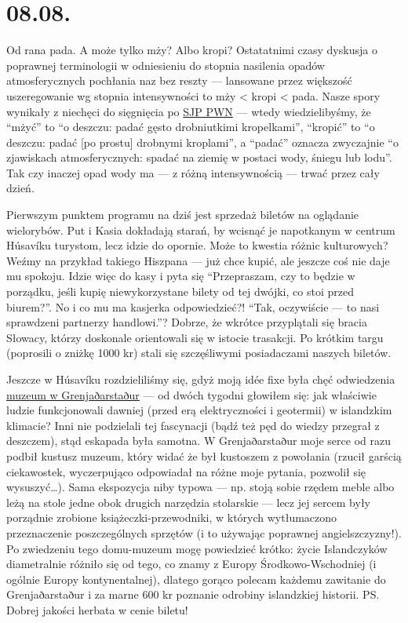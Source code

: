 \chapter*{08.08.}

Od rana pada. A może tylko mży? Albo kropi? Ostatatnimi czasy dyskusja o poprawnej terminologii w odniesieniu do stopnia nasilenia opadów atmosferycznych pochłania naz bez reszty --- lansowane przez większość uszeregowanie wg stopnia intensywności to mży < kropi < pada. Nasze spory wynikały z niechęci do sięgnięcia po \href{http://sjp.pwn.pl/}{SJP PWN} --- wtedy wiedzielibyśmy, że “mżyć” to “o deszczu: padać gęsto drobniutkimi kropelkami”, “kropić” to “o deszczu: padać [po prostu] drobnymi kroplami”, a “padać” oznacza zwyczajnie “o zjawiskach atmosferycznych: spadać na ziemię w postaci wody, śniegu lub lodu”. Tak czy inaczej opad wody ma --- z różną intensywnością --- trwać przez cały dzień.

Pierwszym punktem programu na dziś jest sprzedaż biletów na oglądanie wielorybów. Put i Kasia dokładają starań, by wcisnąć je napotkanym w centrum Húsavíku turystom, lecz idzie do opornie. Może to kwestia różnic kulturowych? Weźmy na przykład takiego Hiszpana --- już chce kupić, ale jeszcze coś nie daje mu spokoju. Idzie więc do kasy i pyta się “Przepraszam, czy to będzie w porządku, jeśli kupię niewykorzystane bilety od tej dwójki, co stoi przed biurem?”. No i co mu ma kasjerka odpowiedzieć?! “Tak, oczywiście --- to nasi sprawdzeni partnerzy handlowi.”? Dobrze, że wkrótce przyplątali się bracia Słowacy, którzy doskonale orientowali się w istocie trasakcji. Po krótkim targu (poprosili o zniżkę 1000 kr) stali się szczęśliwymi posiadaczami naszych biletów.


Jeszcze w Húsavíku rozdzieliliśmy się, gdyż moją idée fixe była chęć odwiedzenia \href{http://www.visithusavik.com/attractions/the-turf-house-museum/}{muzeum w Grenjaðarstaður} --- od dwóch tygodni głowiłem się: jak właściwie ludzie funkcjonowali dawniej (przed erą elektryczności i geotermii) w islandzkim klimacie? Inni nie podzielali tej fascynacji (bądź też pęd do wiedzy przegrał z deszczem), stąd eskapada była samotna. W Grenjaðarstaður moje serce od razu podbił kustusz muzeum, który widać że był kustoszem z powołania (rzucił garścią ciekawostek, wyczerpująco odpowiadał na różne moje pytania, pozwolił się wysuszyć…). Sama ekspozycja niby typowa --- np. stoją sobie rzędem meble albo leżą na stole jedne obok drugich narzędzia stolarskie --- lecz jej sercem były porządnie zrobione książeczki-przewodniki, w których wytłumaczono przeznaczenie poszczególnych sprzętów (i to używając poprawnej angielszczyzny!). Po zwiedzeniu tego domu-muzeum mogę powiedzieć krótko: życie Islandczyków diametralnie różniło się od tego, co znamy z Europy Środkowo-Wschodniej (i ogólnie Europy kontynentalnej), dlatego gorąco polecam każdemu zawitanie do Grenjaðarstaður i za marne 600 kr poznanie odrobiny islandzkiej historii. PS. Dobrej jakości herbata w cenie biletu!

